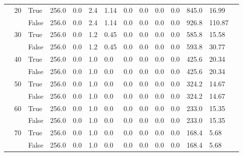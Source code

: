 \begin{landscape}
\begin{small}
\begin{longtable}[c]{@{}lll|ll|ll|ll|ll|lll@{}}
   & 20 & True  & 256.0           & 0.0            & 2.4           & 1.14          & 0.0           & 0.0           & 0.0           & 0.0           & 845.0         & 16.99       &  \\
   &    & False & 256.0           & 0.0            & 2.4           & 1.14          & 0.0           & 0.0           & 0.0           & 0.0           & 926.8         & 110.87      &  \\
   & 30 & True  & 256.0           & 0.0            & 1.2           & 0.45          & 0.0           & 0.0           & 0.0           & 0.0           & 585.8         & 15.58       &  \\
   &    & False & 256.0           & 0.0            & 1.2           & 0.45          & 0.0           & 0.0           & 0.0           & 0.0           & 593.8         & 30.77       &  \\
   & 40 & True  & 256.0           & 0.0            & 1.0           & 0.0           & 0.0           & 0.0           & 0.0           & 0.0           & 425.6         & 20.34       &  \\
   &    & False & 256.0           & 0.0            & 1.0           & 0.0           & 0.0           & 0.0           & 0.0           & 0.0           & 425.6         & 20.34       &  \\
   & 50 & True  & 256.0           & 0.0            & 1.0           & 0.0           & 0.0           & 0.0           & 0.0           & 0.0           & 324.2         & 14.67       &  \\
   &    & False & 256.0           & 0.0            & 1.0           & 0.0           & 0.0           & 0.0           & 0.0           & 0.0           & 324.2         & 14.67       &  \\
   & 60 & True  & 256.0           & 0.0            & 1.0           & 0.0           & 0.0           & 0.0           & 0.0           & 0.0           & 233.0         & 15.35       &  \\
   &    & False & 256.0           & 0.0            & 1.0           & 0.0           & 0.0           & 0.0           & 0.0           & 0.0           & 233.0         & 15.35       &  \\
   & 70 & True  & 256.0           & 0.0            & 1.0           & 0.0           & 0.0           & 0.0           & 0.0           & 0.0           & 168.4         & 5.68        &  \\
   &    & False & 256.0           & 0.0            & 1.0           & 0.0           & 0.0           & 0.0           & 0.0           & 0.0           & 168.4         & 5.68        &  \\

\end{longtable}
\end{small}
\end{landscape}
